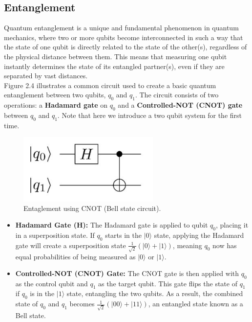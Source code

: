 \subsection{Entanglement}

Quantum entanglement is a unique and fundamental phenomenon in quantum mechanics, where two or more qubits become interconnected in such a way that the state of one qubit is directly related to the state of the other(s), regardless of the physical distance between them. This means that measuring one qubit instantly determines the state of its entangled partner(s), even if they are separated by vast distances.\\

Figure 2.4 illustrates a common circuit used to create a basic quantum entanglement between two qubits, \( q_0 \) and \( q_1 \). The circuit consists of two operations: a \textbf{Hadamard gate} on \( q_0 \) and a \textbf{Controlled-NOT (CNOT) gate} between \( q_0 \) and \( q_1 \). Note that here we introduce a two qubit system for the first time. \newpage

\begin{figure}[ht]
\centering
\includegraphics[width=7cm]{images/cnot.jpg}
\caption{Entaglement using CNOT (Bell state  circuit).}
\end{figure}

\begin{itemize}
    \item \textbf{Hadamard Gate (H):} The Hadamard gate is applied to qubit \( q_0 \), placing it in a superposition state. If \( q_0 \) starts in the \( |0\rangle \) state, applying the Hadamard gate will create a superposition state \( \frac{1}{\sqrt{2}}(|0\rangle + |1\rangle) \), meaning \( q_0 \) now has equal probabilities of being measured as \( |0\rangle \) or \( |1\rangle \).
    
    \item \textbf{Controlled-NOT (CNOT) Gate:} The CNOT gate is then applied with \( q_0 \) as the control qubit and \( q_1 \) as the target qubit. This gate flips the state of \( q_1 \) if \( q_0 \) is in the \( |1\rangle \) state, entangling the two qubits. As a result, the combined state of \( q_0 \) and \( q_1 \) becomes \( \frac{1}{\sqrt{2}}(|00\rangle + |11\rangle) \), an entangled state known as a Bell state. 
\end{itemize}

